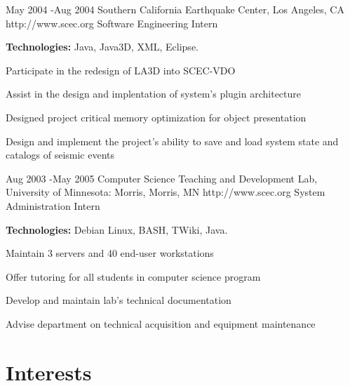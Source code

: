 \documentclass[10pt]{article} %
\begin{document}
\job
{May 2004 -}{Aug 2004}
{Southern California Earthquake Center, Los Angeles, CA}
{http://www.scec.org}
{Software Engineering Intern}
{\rule{0mm}{5mm}\textbf{Technologies:} Java, Java3D, XML, Eclipse.

\begin{itemize-noindent}
\setlength\itemsep{0.12em}
\item{Participate in the redesign of LA3D into SCEC-VDO}
\item{Assist in the design and implentation of system's plugin architecture}
\item{Designed project critical memory optimization for object presentation}
\item{Design and implement the project's ability to save and load system state and catalogs of seismic events}
\end{itemize-noindent}

}


\job
{Aug 2003 -}{May 2005}
{Computer Science Teaching and Development Lab, University of Minnesota: Morris, Morris, MN}
{http://www.scec.org}
{System Administration Intern}
{\rule{0mm}{5mm}\textbf{Technologies:} Debian Linux, BASH, TWiki, Java.

\begin{itemize-noindent}
\setlength\itemsep{0.12em}
\item{Maintain 3 servers and 40 end-user workstations}
\item{Offer tutoring for all students in computer science program}
\item{Develop and maintain lab's technical documentation}
\item{Advise department on technical acquisition and equipment maintenance}
\end{itemize-noindent}

}


\section{Interests}


\end{document}
